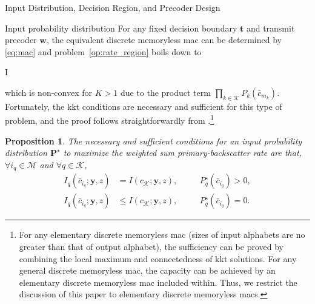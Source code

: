 \documentclass[journal]{IEEEtran}
\newtheorem{proposition}{Proposition}
\begin{document}
\begin{section}{Input Distribution, Decision Region, and Precoder Design}
		\begin{subsection}{Input probability distribution}
			For any fixed decision boundary $\boldsymbol{t}$ and transmit precoder $\boldsymbol{w}$, the equivalent discrete memoryless \gls{mac} can be determined by \eqref{eq:mac} and problem~\eqref{op:rate_region} boils down to
			\begin{maxi!}
				{}{I}{\label{op:input_probability_distribution}}{}
				\addConstraint{\eqref{co:sum_probability},\eqref{co:nonnegative_probability},}
			\end{maxi!}
			which is non-convex for $K > 1$ due to the product term $\prod_{k \in \mathcal{K}} P_k(\bar{c}_{m_k})$. Fortunately, the \gls{kkt} conditions are necessary and sufficient for this type of problem, and the proof follows straightforwardly from \cite{Watanabe2009}.\footnote{For any elementary discrete memoryless \gls{mac} (sizes of input alphabets are no greater than that of output alphabet), the sufficiency can be proved by combining the local maximum and connectedness of \gls{kkt} solutions. For any general discrete memoryless \gls{mac}, the capacity can be achieved by an elementary discrete memoryless \gls{mac} included within. Thus, we restrict the discussion of this paper to elementary discrete memoryless \gls{mac}s.}
			\begin{proposition}
				The necessary and sufficient conditions for an input probability distribution $\boldsymbol{P}^{\star}$ to maximize the weighted sum primary-backscatter rate are that, $\forall i_q \in \mathcal{M}$ and $\forall q \in \mathcal{K}$,
				\begin{subequations}
					\begin{alignat}{2}
						I_q(\bar{c}_{i_q};\boldsymbol{y},z) & = I(c_{\mathcal{K}};\boldsymbol{y},z), \quad && P_q^{\star}(\bar{c}_{i_q}) > 0,\label{co:probable_states}\\
						I_q(\bar{c}_{i_q};\boldsymbol{y},z) & \le I(c_{\mathcal{K}};\boldsymbol{y},z), \quad && P_q^{\star}(\bar{c}_{i_q}) = 0.\label{co:dropped_states}
					\end{alignat}
				\end{subequations}


\end{proposition}
\end{subsection}
\end{section}
\end{document}
